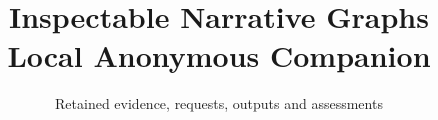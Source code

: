 \documentclass[a4paper,10pt]{article}
\title{Inspectable Narrative Graphs\\Local Anonymous Companion}
\author{}
\date{Retained evidence, requests, outputs and assessments}
\begin{document}
\RaggedRight
\maketitle

\end{document}
